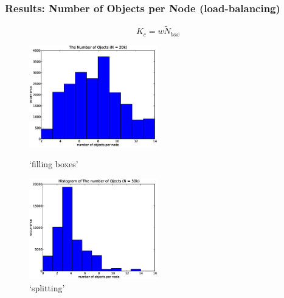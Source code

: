 \documentclass[red]{beamer}
\begin{document}
\begin{frame}
\frametitle{Results: Number of Objects per Node (load-balancing)}
\begin{equation}
K_c=w\tilde N_{box}
\end{equation}
\begin{figure}
\begin{minipage}{5cm}
\centering
\includegraphics[width=2.2in]{figs/obj_node_20k.eps}
\caption{`filling boxes'} 
\end{minipage}
\begin{minipage}{5cm}
\centering
\includegraphics[width=2.2in]{figs/obj_node_50k.eps}
\caption{`splitting'}
\end{minipage}
\end{figure}
\end{frame}
\end{document}
